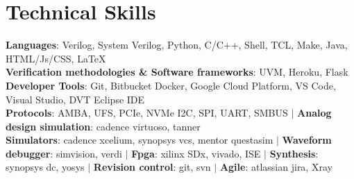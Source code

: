 \documentclass[letterpaper,11pt]{article}
\begin{document}
\section{Technical Skills}
 \begin{itemize}[leftmargin=0.15in, label={}]
    \small{\item{
     \textbf{\scriptsize Languages}{\scriptsize : Verilog, System Verilog, Python, C/C++, Shell, TCL, Make, Java, HTML/Js/CSS, \LaTeX} \\
     \textbf{\scriptsize Verification methodologies \& Software frameworks}{\scriptsize : UVM, Heroku, Flask} \\
     \textbf{\scriptsize Developer Tools}{\scriptsize : Git, Bitbucket Docker, Google Cloud Platform, VS Code, Visual Studio, DVT Eclipse IDE} \\
     \textbf{\scriptsize Protocols}{\scriptsize : AMBA, UFS, PCIe, NVMe I2C, SPI, UART, SMBUS} $|$ \textbf{\scriptsize Analog design simulation}{\scriptsize : cadence virtuoso, tanner}\\
     \textbf{\scriptsize Simulators}{\scriptsize : cadence xcelium, synopsys vcs, mentor questasim} $|$ \textbf{\scriptsize Waveform debugger}{: \scriptsize simvision, verdi} $|$ \textbf{\scriptsize Fpga}{\scriptsize : xilinx SDx, vivado, ISE} $|$ \textbf{\scriptsize Synthesis}{\scriptsize : synopsys dc, yosys} $|$ \textbf{\scriptsize Revision control}{\scriptsize : git, svn} $|$ \textbf{\scriptsize Agile}{\scriptsize : atlassian jira, Xray}
    }}
 \end{itemize}


\end{document}
